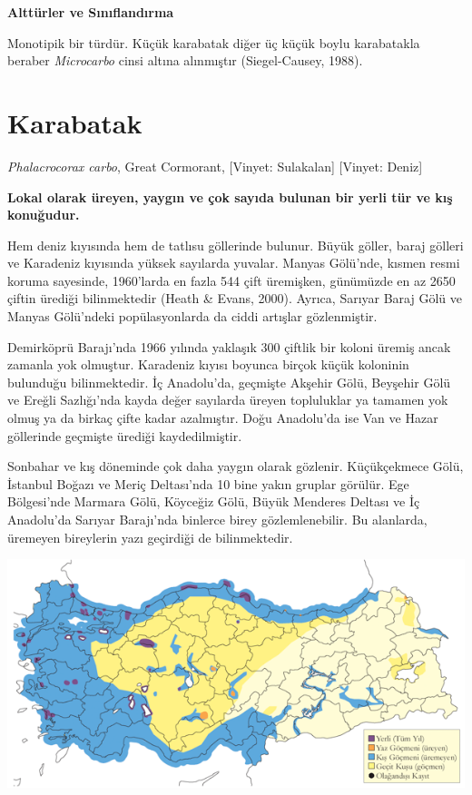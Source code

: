 \documentclass[
  a4paper,
  DIV=11,
  numbers=noendperiod]{scrreprt}
\begin{document}
\textbf{Alttürler ve Sınıflandırma}

Monotipik bir türdür. Küçük karabatak diğer üç küçük boylu karabatakla
beraber \emph{Microcarbo} cinsi altına alınmıştır (Siegel-Causey, 1988).

\section{Karabatak}\label{karabatak}

\emph{Phalacrocorax carbo}, Great Cormorant, {[}Vinyet: Sulakalan{]}
{[}Vinyet: Deniz{]}

\textbf{Lokal olarak üreyen, yaygın ve çok sayıda bulunan bir yerli tür
ve kış konuğudur.}

Hem deniz kıyısında hem de tatlısu göllerinde bulunur. Büyük göller,
baraj gölleri ve Karadeniz kıyısında yüksek sayılarda yuvalar. Manyas
Gölü'nde, kısmen resmi koruma sayesinde, 1960'larda en fazla 544 çift
üremişken, günümüzde en az 2650 çiftin ürediği bilinmektedir (Heath \&
Evans, 2000). Ayrıca, Sarıyar Baraj Gölü ve Manyas Gölü'ndeki
popülasyonlarda da ciddi artışlar gözlenmiştir.

Demirköprü Barajı'nda 1966 yılında yaklaşık 300 çiftlik bir koloni
üremiş ancak zamanla yok olmuştur. Karadeniz kıyısı boyunca birçok küçük
koloninin bulunduğu bilinmektedir. İç Anadolu'da, geçmişte Akşehir Gölü,
Beyşehir Gölü ve Ereğli Sazlığı'nda kayda değer sayılarda üreyen
topluluklar ya tamamen yok olmuş ya da birkaç çifte kadar azalmıştır.
Doğu Anadolu'da ise Van ve Hazar göllerinde geçmişte ürediği
kaydedilmiştir.

Sonbahar ve kış döneminde çok daha yaygın olarak gözlenir. Küçükçekmece
Gölü, İstanbul Boğazı ve Meriç Deltası'nda 10 bine yakın gruplar
görülür. Ege Bölgesi'nde Marmara Gölü, Köyceğiz Gölü, Büyük Menderes
Deltası ve İç Anadolu'da Sarıyar Barajı'nda binlerce birey
gözlemlenebilir. Bu alanlarda, üremeyen bireylerin yazı geçirdiği de
bilinmektedir.

\includegraphics{images/harita_Page_079.png}
\end{document}
